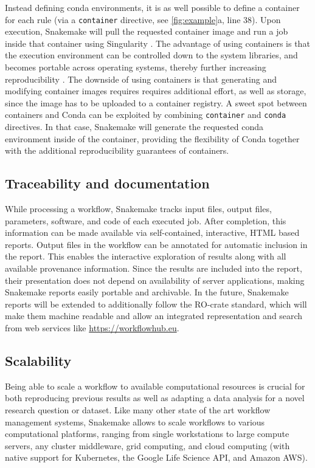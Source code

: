 \documentclass[parskip=half]{scrartcl}
\let\plainurl\url
\renewcommand{\url}[1]{\protect\plainurl{#1}}
\begin{document}
Instead defining conda environments, it is as well possible to define a container for each rule (via a \lstinline!container! directive, see \autoref{fig:example}a, line 38).
Upon execution, Snakemake will pull the requested container image and run a job inside that container using Singularity \parencite{kurtzer_singularity_2017}.
The advantage of using containers is that the execution environment can be controlled down to the system libraries, and becomes portable across operating systems, thereby further increasing reproducibility \parencite{gruning_practical_2018}.
The downside of using containers is that generating and modifying container images requires requires additional effort, as well as storage, since the image has to be uploaded to a container registry.
A sweet spot between containers and Conda can be exploited by combining \lstinline!container! and \lstinline!conda! directives.
In that case, Snakemake will generate the requested conda environment inside of the container, providing the flexibility of Conda together with the additional reproducibility guarantees of containers.

\subsection{Traceability and documentation}

While processing a workflow, Snakemake tracks input files, output files, parameters, software, and code of each executed job.
After completion, this information can be made available via self-contained, interactive, HTML based reports.
Output files in the workflow can be annotated for automatic inclusion in the report.
This enables the interactive exploration of results along with all available provenance information.
Since the results are included into the report, their presentation does not depend on availability of server applications, making Snakemake reports easily portable and archivable.
In the future, Snakemake reports will be extended to additionally follow the RO-crate standard, which will make them machine readable and allow an integrated representation and search from web services like \url{https://workflowhub.eu}.

\subsection{Scalability}

Being able to scale a workflow to available computational resources is crucial for both reproducing previous results as well as adapting a data analysis for a novel research question or dataset.
Like many other state of the art workflow management systems, Snakemake allows to scale workflows to various computational platforms, ranging from single workstations to large compute servers, any cluster middleware, grid computing, and cloud computing (with native support for Kubernetes, the Google Life Science API, and Amazon AWS).
\end{document}
